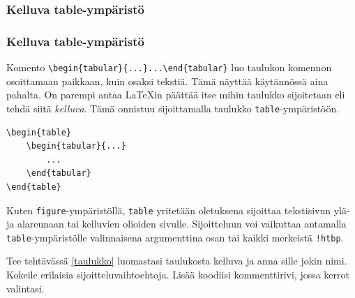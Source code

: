 \subsubsection{Kelluva table-ympäristö}
\begin{frame}[fragile]
    \frametitle{Kelluva table-ympäristö}
Komento \verb-\begin{tabular}{...}...\end{tabular}- luo taulukon komennon osoittamaan paikkaan, kuin osaksi tekstiä. Tämä näyttää käytännössä aina pahalta. 
    \vaihto
    On parempi antaa \LaTeX in päättää itse mihin taulukko sijoitetaan eli tehdä siitä \emph{kelluva}. Tämä onnistuu sijoittamalla taulukko \verb-table--ympäristöön.
    \begin{Verbatim}[frame=single]
\begin{table}
    \begin{tabular}{...}
        ...
    \end{tabular}
\end{table}
    \end{Verbatim}
    Kuten \verb-figure--ympäristöllä, \verb-table- yritetään oletuksena sijoittaa tekstisivun ylä- ja alareunaan tai kelluvien olioiden sivulle. Sijoitteluun voi vaikuttaa antamalla \verb-table--ympäristölle valinnaisena argumenttina osan tai kaikki merkeistä \verb-!htbp-.
\end{frame}
%
%
\begin{frame}[fragile]
    \begin{harj}\label{kelluvaTaulukko}
        Tee tehtävässä \ref{taulukko} luomastasi taulukosta kelluva ja anna sille jokin nimi. Kokeile erilaisia sijoitteluvaihtoehtoja. Lisää koodiisi kommenttirivi, jossa kerrot valintasi. 
    \end{harj}

\end{frame}
